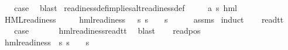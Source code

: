 \begin{isabellebody}
\ \ \isamarkupfalse%
\ \isamarkupfalse%
\ {\isacharquery}{\kern0pt}case\ \isamarkupfalse%
\ blast\isanewline
{}\isamarkupfalse%
%
\endisatagproof
{\isafoldproof}%
%
\isadelimproof
\isanewline
%
\endisadelimproof
\isanewline
{}\isamarkupfalse%
\ readiness{\isacharunderscore}{\kern0pt}def{\isacharunderscore}{\kern0pt}implies{\isacharunderscore}{\kern0pt}alt{\isacharunderscore}{\kern0pt}readiness{\isacharunderscore}{\kern0pt}def{\isacharcolon}{\kern0pt}\isanewline
\ \ \ {\isasymphi}\ {\isacharcolon}{\kern0pt}{\isacharcolon}{\kern0pt}\ {\isachardoublequoteopen}{\isacharparenleft}{\kern0pt}{\isacharprime}{\kern0pt}a{\isacharcomma}{\kern0pt}\ {\isacharprime}{\kern0pt}s{\isacharparenright}{\kern0pt}\ hml{\isachardoublequoteclose}\isanewline
\ \ \ {\isachardoublequoteopen}HML{\isacharunderscore}{\kern0pt}readiness\ {\isasymphi}{\isachardoublequoteclose}\isanewline
\ \ \ {\isachardoublequoteopen}{\isasymexists}{\isasympsi}{\isachardot}{\kern0pt}\ hml{\isacharunderscore}{\kern0pt}readiness\ {\isasympsi}\ {\isasymand}\ {\isacharparenleft}{\kern0pt}{\isasymforall}s{\isachardot}{\kern0pt}\ {\isacharparenleft}{\kern0pt}s\ {\isasymTurnstile}\ {\isasymphi}{\isacharparenright}{\kern0pt}\ {\isasymlongleftrightarrow}\ {\isacharparenleft}{\kern0pt}s\ {\isasymTurnstile}\ {\isasympsi}{\isacharparenright}{\kern0pt}{\isacharparenright}{\kern0pt}{\isachardoublequoteclose}\isanewline
%
\isadelimproof
\ \ %
\endisadelimproof
%
\isatagproof
{}\isamarkupfalse%
\ assms\ \isamarkupfalse%
{\isacharparenleft}{\kern0pt}induct{\isacharparenright}{\kern0pt}\isanewline
\ \ \isamarkupfalse%
\ read{\isacharunderscore}{\kern0pt}tt\isanewline
\ \ \isamarkupfalse%
\ \isamarkupfalse%
\ {\isacharquery}{\kern0pt}case\ \isanewline
\ \ \ \ \isamarkupfalse%
\ hml{\isacharunderscore}{\kern0pt}readiness{\isachardot}{\kern0pt}read{\isacharunderscore}{\kern0pt}tt\ \isamarkupfalse%
\ blast\isanewline
{}\isamarkupfalse%
\isanewline
\ \ \isamarkupfalse%
\ {\isacharparenleft}{\kern0pt}read{\isacharunderscore}{\kern0pt}pos\ {\isasymphi}\ {\isasymalpha}{\isacharparenright}{\kern0pt}\isanewline
\ \ \isamarkupfalse%
\ \isamarkupfalse%
\ {\isasympsi}\ \ {\isachardoublequoteopen}hml{\isacharunderscore}{\kern0pt}readiness\ {\isasympsi}{\isachardoublequoteclose}\ {\isachardoublequoteopen}{\isacharparenleft}{\kern0pt}{\isasymforall}s{\isachardot}{\kern0pt}\ {\isacharparenleft}{\kern0pt}s\ {\isasymTurnstile}\ {\isasymphi}{\isacharparenright}{\kern0pt}\ {\isacharequal}{\kern0pt}\ {\isacharparenleft}{\kern0pt}s\ {\isasymTurnstile}\ {\isasympsi}{\isacharparenright}{\kern0pt}{\isacharparenright}{\kern0pt}{\isachardoublequoteclose}\ \isamarkupfalse%

\end{isabellebody}
